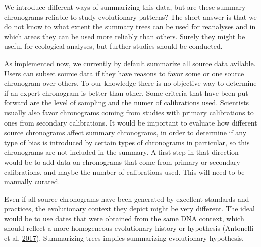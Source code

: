 \documentclass[]{article}
\begin{document}
We introduce different ways of summarizing this data, but are these summary chronograms reliable to study evolutionary patterns? The short answer is that we do not know to what extent the summary trees can be used for reanalyses and in which areas they can be used more reliably than others. Surely they might be useful for ecological analyses, but further studies should be conducted.

As implemented now, we currently by default summarize all source data avilable. Users can subset source data if they have reasons to favor some or one source chronogram over others. To our knowledge there is no objective way to determine if an expert chronogram is better than other. Some criteria that have been put forward are the level of sampling and the numer of calibrations used. Scientists usually also favor chronograms coming from studies with primary calibrations to ones from secondary calibrations.
It would be important to evaluate how different source chronograms affect summary chronograms, in order to determine if any type of bias is introduced by certain types of chronograms in particular, so this chronograms are not included in the summary.
A first step in that direction would be to add data on chronograms that come from primary or secondary calibrations, and maybe the number of calibrations used. This will need to be manually curated.

Even if all source chronograms have been generated by excellent standards and practices, the evolutionary context they depict might be very different.
The ideal would be to use dates that were obtained from the same DNA context, which should reflect a more homogeneous evolutionary history or hypothesis (Antonelli et al. \protect\hyperlink{ref-antonelli2017supersmart}{2017}). Summarizing trees implies summarizing evolutionary hypothesis.
\end{document}
